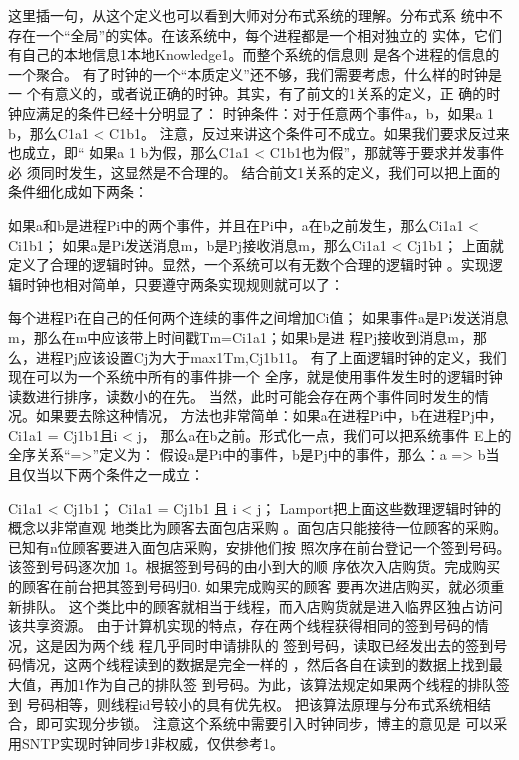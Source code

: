 这里插一句，从这个定义也可以看到大师对分布式系统的理解。分布式系
统中不存在一个“全局”的实体。在该系统中，每个进程都是一个相对独立的
实体，它们有自己的本地信息1本地Knowledge1。而整个系统的信息则
是各个进程的信息的一个聚合。
有了时钟的一个“本质定义”还不够，我们需要考虑，什么样的时钟是一
个有意义的，或者说正确的时钟。其实，有了前文的1关系的定义，正
确的时钟应满足的条件已经十分明显了：
时钟条件：对于任意两个事件a，b，如果a 1 b，那么C1a1 < C1b1。
注意，反过来讲这个条件可不成立。如果我们要求反过来也成立，即“
如果a 1 b为假，那么C1a1 < C1b1也为假”，那就等于要求并发事件必
须同时发生，这显然是不合理的。
结合前文1关系的定义，我们可以把上面的条件细化成如下两条：

如果a和b是进程Pi中的两个事件，并且在Pi中，a在b之前发生，那么Ci1a1 < Ci1b1；
如果a是Pi发送消息m，b是Pj接收消息m，那么Ci1a1 < Cj1b1；
上面就定义了合理的逻辑时钟。显然，一个系统可以有无数个合理的逻辑时钟
。实现逻辑时钟也相对简单，只要遵守两条实现规则就可以了：

每个进程Pi在自己的任何两个连续的事件之间增加Ci值；
如果事件a是Pi发送消息m，那么在m中应该带上时间戳Tm=Ci1a1；如果b是进
程Pj接收到消息m，那么，进程Pj应该设置Cj为大于max1Tm,Cj1b11。
有了上面逻辑时钟的定义，我们现在可以为一个系统中所有的事件排一个
全序，就是使用事件发生时的逻辑时钟读数进行排序，读数小的在先。
当然，此时可能会存在两个事件同时发生的情况。如果要去除这种情况，
方法也非常简单：如果a在进程Pi中，b在进程Pj中，Ci1a1 = Cj1b1且i < j，
那么a在b之前。形式化一点，我们可以把系统事件
E上的全序关系“=>”定义为：
假设a是Pi中的事件，b是Pj中的事件，那么：a => b当
且仅当以下两个条件之一成立：

Ci1a1 < Cj1b1；
Ci1a1 = Cj1b1 且 i < j；
Lamport把上面这些数理逻辑时钟的概念以非常直观
地类比为顾客去面包店采购
。面包店只能接待一位顾客的采购。已知有n位顾客要进入面包店采购，安排他们按
照次序在前台登记一个签到号码。该签到号码逐次加
1。根据签到号码的由小到大的顺
序依次入店购货。完成购买的顾客在前台把其签到号码归0. 如果完成购买的顾客
要再次进店购买，就必须重新排队。
这个类比中的顾客就相当于线程，而入店购货就是进入临界区独占访问该共享资源。
由于计算机实现的特点，存在两个线程获得相同的签到号码的情况，这是因为两个线
程几乎同时申请排队的
签到号码，读取已经发出去的签到号码情况，这两个线程读到的数据是完全一样的
，然后各自在读到的数据上找到最大值，再加1作为自己的排队签
到号码。为此，该算法规定如果两个线程的排队签到
号码相等，则线程id号较小的具有优先权。
把该算法原理与分布式系统相结合，即可实现分步锁。
注意这个系统中需要引入时钟同步，博主的意见是
可以采用SNTP实现时钟同步1非权威，仅供参考1。

